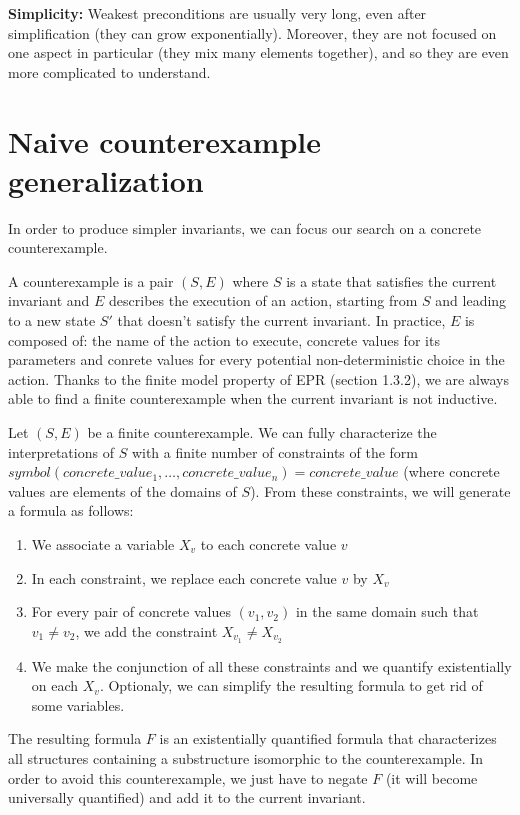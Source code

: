 \documentclass[11pt,a4paper,oldfontcommands,openany]{memoir}
\begin{document}
    \textbf{Simplicity:} Weakest preconditions are usually very long, even after simplification (they can grow exponentially).
    Moreover, they are not focused on one aspect in particular (they mix many elements together), and so they are even more complicated
    to understand.

    \section{Naive counterexample generalization}

    In order to produce simpler invariants, we can focus our search on a concrete counterexample.

    A counterexample is a pair \( (S,E) \) where \(S\) is a state that satisfies the current invariant and \(E\) describes the execution of an action, starting from \(S\)
    and leading to a new state \(S'\) that doesn't satisfy the current invariant. In practice, \(E\) is composed of:
    the name of the action to execute, concrete values for its parameters and conrete values for every potential non-deterministic choice in the action.
    Thanks to the finite model property of EPR (section 1.3.2), we are always able to find a finite counterexample when the current invariant is not inductive.
    
    Let \( (S,E) \) be a finite counterexample.
    We can fully characterize the interpretations of \(S\) with a finite number of constraints of the form \(symbol(concrete\_value_1,\ldots,concrete\_value_n) = concrete\_value\)
    (where concrete values are elements of the domains of \(S\)).
    From these constraints, we will generate a formula as follows:
    \begin{enumerate}
        \item We associate a variable \( X_v \) to each concrete value \(v\)
        \item In each constraint, we replace each concrete value \(v\) by \( X_v \)
        \item For every pair of concrete values \( (v_1,v_2) \) in the same domain such that \( v_1 \neq v_2 \), we add the constraint \( X_{v_1} \neq X_{v_2} \)
        \item We make the conjunction of all these constraints and we quantify existentially on each \(X_v\). Optionaly, we can simplify the resulting formula to get rid of some variables.
    \end{enumerate}
    
    The resulting formula \(F\) is an existentially quantified formula that characterizes all structures containing a substructure isomorphic to the counterexample.
    In order to avoid this counterexample, we just have to negate \(F\) (it will become universally quantified) and add it to the current invariant.
\end{document}
